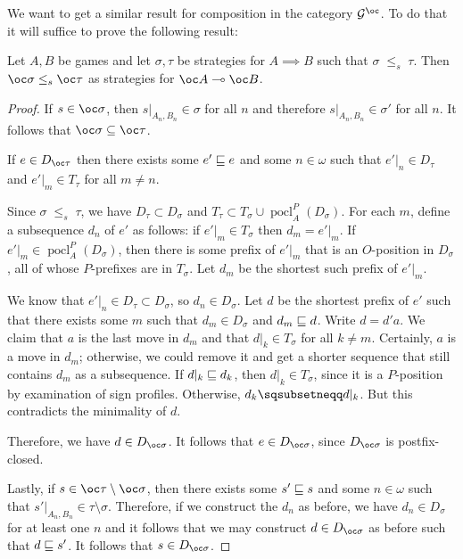 \documentclass{entcs} \usepackage{prentcsmacro}
\newcommand{\stle}{{\;\le_s\;}}
\DeclareMathOperator{\pocl}{pocl}
\newcommand{\0}{{\mathtt{0}}}
\begin{document}
We want to get a similar result for composition in the category $\G^{\oc}$.  To do that it will suffice to prove the following result:

\begin{proposition}
  \label{exponentiationMonotonicSO}
  Let $A,B$ be games and let $\sigma,\tau$ be strategies for $A\implies B$ such that $\sigma\stle\tau$.  Then $\oc\sigma\stle\oc\tau$ as strategies for $\oc A\implies \oc B$.
\end{proposition}
  \begin{proof}
    If $s\in\oc\sigma$, then $s\vert_{A_n,B_n}\in\sigma$ for all $n$ and therefore $s\vert_{A_n,B_n}\in\sigma'$ for all $n$.  It follows that $\oc\sigma\subset\oc\tau$.

    If $e\in D_{\oc\tau}$ then there exists some $e'\sqsubseteq e$ and some $n\in\omega$ such that $e'\vert_n\in D_\tau$ and $e'\vert_m\in T_\tau$ for all $m\ne n$.  

    Since $\sigma\stle\tau$, we have $D_\tau\subset D_\sigma$ and $T_\tau\subset T_\sigma\cup \pocl_A^P(D_\sigma)$.  For each $m$, define a subsequence $d_n$ of $e'$ as follows: if $e'\vert_m\in T_\sigma$ then $d_m=e'\vert_m$.  If $e'\vert_m\in \pocl_A^P(D_\sigma)$, then there is some prefix of $e'\vert_m$ that is an $O$-position in $D_\sigma$, all of whose $P$-prefixes are in $T_\sigma$.  Let $d_m$ be the shortest such prefix of $e'\vert_m$.

    We know that $e'\vert_n\in D_\tau\subset D_\sigma$, so $d_n\in D_\sigma$.  Let $d$ be the shortest prefix of $e'$ such that there exists some $m$ such that $d_m\in D_\sigma$ and $d_m\sqsubseteq d$.  Write $d=d'a$.  We claim that $a$ is the last move in $d_m$ and that $d\vert_k\in T_\sigma$ for all $k\neq m$.  Certainly, $a$ is a move in $d_m$; otherwise, we could remove it and get a shorter sequence that still contains $d_m$ as a subsequence.  If $d\vert_k\sqsubseteq d_k$, then $d\vert_k\in T_\sigma$, since it is a $P$-position by examination of sign profiles.  Otherwise, $d_k\pprefix d\vert_k$.  But this contradicts the minimality of $d$.  

    Therefore, we have $d\in D_{\oc\sigma}$.  It follows that $e\in D_{\oc\sigma}$, since $D_{\oc\sigma}$ is postfix-closed.

    Lastly, if $s\in \oc\tau\setminus\oc\sigma$, then there exists some $s'\sqsubseteq s$ and some $n\in\omega$ such that $s'\vert_{A_n,B_n}\in\tau\setminus\sigma$.  Therefore, if we construct the $d_n$ as before, we have $d_n\in D_\sigma$ for at least one $n$ and it follows that we may construct $d\in D_{\oc\sigma}$ as before such that $d\sqsubseteq s'$.  It follows that $s\in D_{\oc\sigma}$.  
  \end{proof}
\end{document}

